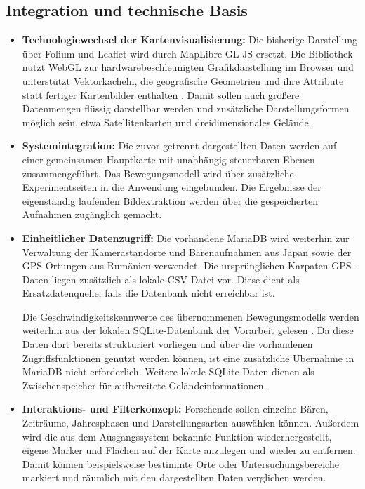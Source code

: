 \documentclass[12pt,a4paper]{report}
\begin{document}
\subsection*{Integration und technische Basis}

\begin{itemize}
    
    
    
    \item \textbf{Technologiewechsel der Kartenvisualisierung:}
    Die bisherige Darstellung über Folium und Leaflet
    wird durch MapLibre GL JS ersetzt. Die Bibliothek
    nutzt WebGL zur hardwarebeschleunigten
    Grafikdarstellung im Browser \cite{MatsudaLea2013}
    und unterstützt Vektorkacheln, die geografische
    Geometrien und ihre Attribute statt fertiger
    Kartenbilder enthalten \cite{Rechsteiner2024,MapLibreDocs}.
    Damit sollen auch größere Datenmengen flüssig
    darstellbar werden und zusätzliche
    Darstellungsformen möglich sein, etwa
    Satellitenkarten und dreidimensionales Gelände.
    
    


    \item \textbf{Systemintegration:}
    Die zuvor getrennt dargestellten Daten werden
    auf einer gemeinsamen Hauptkarte mit unabhängig
    steuerbaren Ebenen zusammengeführt. Das
    Bewegungsmodell wird über zusätzliche Experimentseiten
    in die Anwendung eingebunden. Die Ergebnisse der
    eigenständig laufenden Bildextraktion werden
    über die gespeicherten Aufnahmen zugänglich gemacht.
    
    
    \item \textbf{Einheitlicher Datenzugriff:}
    Die vorhandene MariaDB wird weiterhin zur
    Verwaltung der Kamerastandorte und Bärenaufnahmen
    aus Japan sowie der GPS-Ortungen aus Rumänien
    verwendet. Die ursprünglichen Karpaten-GPS-Daten
    liegen zusätzlich als lokale CSV-Datei vor.
    Diese dient als Ersatzdatenquelle, falls die
    Datenbank nicht erreichbar ist.
    
    Die Geschwindigkeitskennwerte des übernommenen
    Bewegungsmodells werden weiterhin aus der lokalen
    SQLite-Datenbank der Vorarbeit gelesen
    \cite{BreuBA}. Da diese Daten dort bereits
    strukturiert vorliegen und über die vorhandenen
    Zugriffsfunktionen genutzt werden können, ist
    eine zusätzliche Übernahme in MariaDB nicht
    erforderlich. Weitere lokale SQLite-Daten
    dienen als Zwischenspeicher für aufbereitete
    Geländeinformationen.


    
    \item \textbf{Interaktions- und Filterkonzept:}
    Forschende sollen einzelne Bären, Zeiträume,
    Jahresphasen und Darstellungsarten auswählen können.
    Außerdem wird die aus dem Ausgangssystem bekannte
    Funktion wiederhergestellt, eigene Marker und Flächen
    auf der Karte anzulegen und wieder zu entfernen.
    Damit können beispielsweise bestimmte Orte oder
    Untersuchungsbereiche markiert und räumlich mit
    den dargestellten Daten verglichen werden.
    
\end{itemize}
\end{document}
